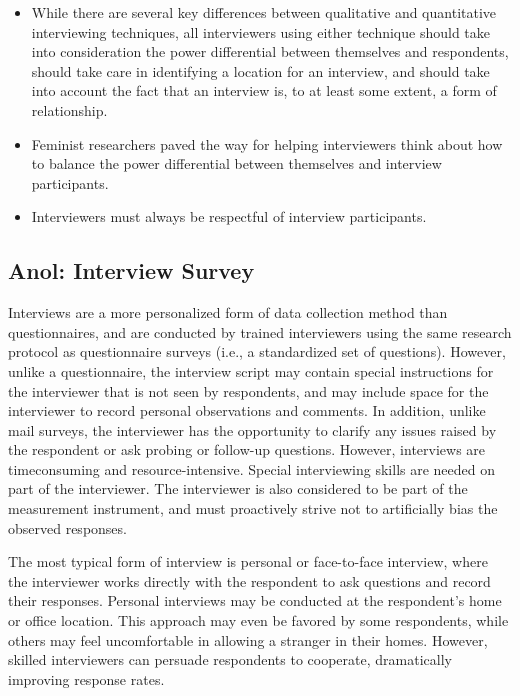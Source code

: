 \begin{itemize}
	\setlength{\itemsep}{0pt}
	\setlength{\parskip}{0pt}
	\setlength{\parsep}{0pt}
	
	\item While there are several key differences between qualitative and quantitative interviewing techniques, all interviewers using either technique should take into consideration the power differential between themselves and respondents, should take care in identifying a location for an interview, and should take into account the fact that an interview is, to at least some extent, a form of relationship.
	\item Feminist researchers paved the way for helping interviewers think about how to balance the power differential between themselves and interview participants.
	\item Interviewers must always be respectful of interview participants.
	
\end{itemize}

\subsection{Anol: Interview Survey}

Interviews are a more personalized form of data collection method than questionnaires, and are conducted by trained interviewers using the same research protocol as questionnaire surveys (i.e., a standardized set of questions). However, unlike a questionnaire, the interview script may contain special instructions for the interviewer that is not seen by respondents, and may include space for the interviewer to record personal observations and comments. In addition, unlike mail surveys, the interviewer has the opportunity to clarify any issues raised by the respondent or ask probing or follow-up questions. However, interviews are timeconsuming and resource-intensive. Special interviewing skills are needed on part of the interviewer. The interviewer is also considered to be part of the measurement instrument, and must proactively strive not to artificially bias the observed responses.

The most typical form of interview is personal or face-to-face interview, where the interviewer works directly with the respondent to ask questions and record their responses. Personal interviews may be conducted at the respondent’s home or office location. This approach may even be favored by some respondents, while others may feel uncomfortable in allowing a stranger in their homes. However, skilled interviewers can persuade respondents to cooperate, dramatically improving response rates.

